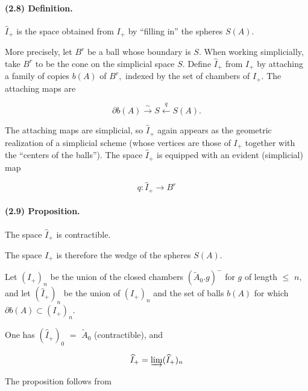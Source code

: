 \documentclass[10pt,a4paper]{article}
\begin{document}
\paragraph{(2.8) Definition.} \ensuremath{\widehat{I}_+} is the space obtained from \ensuremath{I_+} by ``filling in'' the spheres \ensuremath{S(A).}

More precisely, let \ensuremath{B^r} be a ball whose boundary is \ensuremath{S.} When working simplicially, take \ensuremath{B^r} to be the cone on the simplicial space \ensuremath{S.} Define \ensuremath{\widehat{I}_+} from \ensuremath{I_+} by attaching a family of copies \ensuremath{b(A)} of \ensuremath{B^r,} indexed by the set of chambers of \ensuremath{I_+.} The attaching maps are\par

\[
\partial b(A) \xrightarrow{\sim} S \xleftarrow{q} S(A).
\]

The attaching maps are simplicial, so \ensuremath{\widehat{I}_+} again appears as the geometric realization of a simplicial scheme (whose vertices are those of \ensuremath{I_+} together with the ``centers of the balls''). The space \ensuremath{\widehat{I}_+} is equipped with an evident (simplicial) map\par

\[
q : \widehat{I}_+ \longrightarrow{} B^r
\]

\paragraph{(2.9) Proposition.} The space \ensuremath{\widehat{I}_+} is contractible.

The space \ensuremath{I_+} is therefore the wedge of the spheres \ensuremath{S(A).}\par

Let \ensuremath{(I_+)_n} be the union of the closed chambers \ensuremath{(\widetilde{A}_0.g)^{-}} for \ensuremath{g} of length \ensuremath{\le{}} \ensuremath{n,} and let \ensuremath{(\widehat{I}_+)_n} be the union of \ensuremath{(I_+)_n} and the set of balls \ensuremath{b(A)} for which \ensuremath{\partial{}b(A)\subset{}(I_+)_n.}\par

One has \ensuremath{(\widehat{I}_+)_0} \ensuremath{=} \ensuremath{\widetilde{A}_0} (contractible), and\par

\[
\widehat{I}_+ = \varinjlim (\widehat{I}_+)_n
\]

The proposition follows from\par
\end{document}
